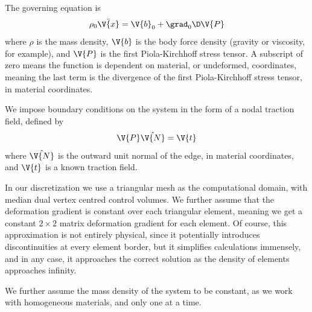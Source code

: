 \documentclass[sigconf]{acmart}
\begin{document}
The governing equation is
\begin{equation}\label{key}
	\rho_0 \ddot{\V{x}} = \V{b}_0 + \grad_{0} \D \V{P}
\end{equation}
where $ \rho $ is the mass density, $ \V{b} $ is the body force density (gravity or viscosity, for example), and $ \V{P} $ is the first Piola-Kirchhoff stress tensor. A subscript of zero means the function is dependent on material, or undeformed, coordinates, meaning the last term is the divergence of the first Piola-Kirchhoff stress tensor, in material coordinates.

We impose boundary conditions on the system in the form of a nodal traction field, defined by
\begin{equation}\label{key}
	\V{P}\hat{\V{N}}=\V{t}
\end{equation}
where $ \hat{\V{N}} $ is the outward unit normal of the edge, in material coordinates, and $ \V{t} $ is a known traction field.

In our discretization we use a triangular mesh as the computational domain, with median dual vertex centred control volumes. We further assume that the deformation gradient is constant over each triangular element, meaning we get a constant $ 2\times 2 $ matrix deformation gradient for each element. Of course, this approximation is not entirely physical, since it potentially introduces discontinuities at every element border, but it simplifies calculations immensely, and in any case, it approaches the correct solution as the density of elements approaches infinity.

We further assume the mass density of the system to be constant, as we work with homogeneous materials, and only one at a time. 
\end{document}

